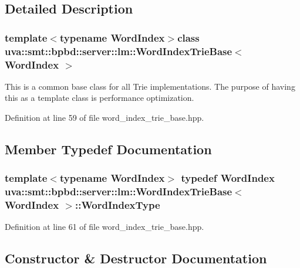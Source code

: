 \subsection{Detailed Description}
\subsubsection*{template$<$typename Word\+Index$>$class uva\+::smt\+::bpbd\+::server\+::lm\+::\+Word\+Index\+Trie\+Base$<$ Word\+Index $>$}

This is a common base class for all Trie implementations. The purpose of having this as a template class is performance optimization. 

Definition at line 59 of file word\+\_\+index\+\_\+trie\+\_\+base.\+hpp.



\subsection{Member Typedef Documentation}
\hypertarget{classuva_1_1smt_1_1bpbd_1_1server_1_1lm_1_1_word_index_trie_base_a77ee32bf3a9f8a89558bda4f2031200c}{}
\subsubsection[{Word\+Index\+Type}]{\setlength{\rightskip}{0pt plus 5cm}template$<$typename Word\+Index$>$ typedef Word\+Index {\bf uva\+::smt\+::bpbd\+::server\+::lm\+::\+Word\+Index\+Trie\+Base}$<$ Word\+Index $>$\+::{\bf Word\+Index\+Type}}\label{classuva_1_1smt_1_1bpbd_1_1server_1_1lm_1_1_word_index_trie_base_a77ee32bf3a9f8a89558bda4f2031200c}


Definition at line 61 of file word\+\_\+index\+\_\+trie\+\_\+base.\+hpp.



\subsection{Constructor \& Destructor Documentation}
\hypertarget{classuva_1_1smt_1_1bpbd_1_1server_1_1lm_1_1_word_index_trie_base_a61b3b0e58d0e562930ff53a5892c31e3}{}
